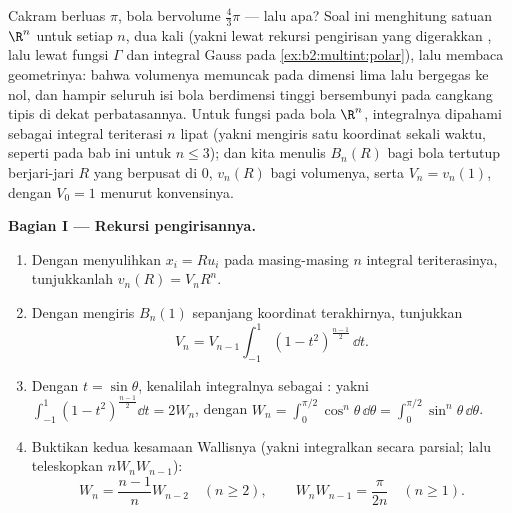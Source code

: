 \begin{problem}[{Soal akhir pekan --- $V_n =
\pi^{n/2}/\Gamma(\frac n2 + 1)$, dan keanehan dimensi
tinggi}]\label{pb:b2:multint:1}
Cakram berluas $\pi$, bola bervolume $\frac43\pi$ --- lalu
apa? Soal ini menghitung  satuan
$\R^n$ untuk setiap $n$, dua kali (yakni lewat rekursi pengirisan yang digerakkan
, lalu lewat fungsi $\Gamma$ dan
integral Gauss pada \cref{ex:b2:multint:polar}), lalu membaca
geometrinya: bahwa volumenya memuncak pada dimensi lima lalu bergegas
ke nol, dan hampir seluruh isi bola berdimensi tinggi bersembunyi pada
cangkang tipis di dekat perbatasannya. Untuk fungsi  pada bola $\R^n$,
integralnya dipahami sebagai integral teriterasi $n$ lipat
(yakni mengiris satu koordinat sekali waktu, seperti pada bab ini untuk $n
\leq 3$); dan kita menulis $B_n(R)$ bagi bola tertutup berjari-jari $R$
yang berpusat di $0$, $v_n(R)$ bagi volumenya, serta $V_n =
v_n(1)$, dengan $V_0 = 1$ menurut konvensinya.

\medskip
\noindent\textbf{Bagian I --- Rekursi pengirisannya.}
\begin{enumerate}
  \item Dengan menyulihkan $x_i = Ru_i$ pada masing-masing $n$ integral
        teriterasinya, tunjukkanlah $v_n(R) = V_nR^n$.
  \item Dengan mengiris $B_n(1)$ sepanjang koordinat terakhirnya, tunjukkan
        \[
        V_n = V_{n-1}\int_{-1}^{1}(1 -
        t^2)^{\frac{n-1}2}\,\dd t .
        \]
  \item Dengan $t = \sin\theta$, kenalilah integralnya sebagai
        : yakni $\int_{-1}^1(1 -
        t^2)^{\frac{n-1}2}\dd t = 2W_n$, dengan $W_n =
        \int_0^{\pi/2}\cos^n\theta\,\dd\theta =
        \int_0^{\pi/2}\sin^n\theta\,\dd\theta$.
  \item Buktikan kedua kesamaan Wallisnya (yakni integralkan secara parsial;
        lalu teleskopkan $nW_nW_{n-1}$):
        \[
        W_n = \frac{n-1}nW_{n-2} \quad (n \geq 2),
        \qquad
        W_nW_{n-1} = \frac{\pi}{2n} \quad (n \geq 1).
        \]
\end{enumerate}


\end{problem}

